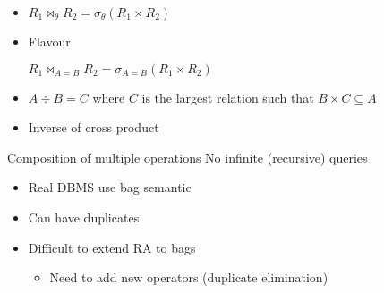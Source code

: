 \begin{itemize}
\begin{itemize}
\begin{itemize}
\begin{itemize}
                        \end{itemize}
                \end{itemize}
                \begin{itemize}
                    \item $R_1 \bowtie_\theta R_2 = \sigma_\theta (R_1 \times R_2)$
                    \item Flavour
                        \begin{itemize}
                             $R_1 \bowtie_{A=B} R_2 = \sigma_{A=B} (R_1 \times R_2)$
                        \end{itemize}
                \end{itemize}
                \begin{itemize}
                    \item $A \div B = C$ where $C$ is the largest relation such that $B \times C \subseteq A$
                    \item Inverse of cross product
                \end{itemize}
        \end{itemize}
     Composition of multiple operations
    \icon No infinite (recursive) queries
        \begin{itemize}
            \item Real DBMS use bag semantic
            \item Can have duplicates
            \item Difficult to extend RA to bags
                \begin{itemize}
                    \item Need to add new operators (duplicate elimination)
                \end{itemize}
        \end{itemize}
\end{itemize}

